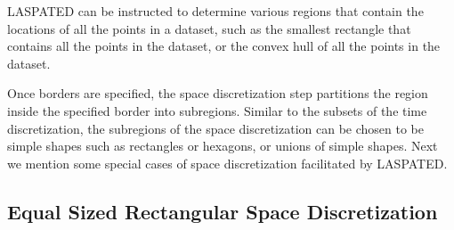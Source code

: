 \documentclass[article]{jss}
\newcommand{\ignore}[1]{}
\begin{document}
LASPATED can be instructed to determine various regions that contain the locations of all the points in a dataset, such as the smallest rectangle that contains all the points in the dataset, or the convex hull of all the points in the dataset.
\ignore{
If a customized border is not available, we can use a rectangular border containing all events or the convex hull of the space observations.
In the first case, the argument of parameter {\tt{method}} of LASPATED method add\_max\_borders is "rectangle" while in the second case this parameter {\tt{method}} is "convex".
The following Example \ref{list:5} shows how to define these borders.
Only one of these two options must be chosen.

\begin{lstlisting}[label={list:5},caption=Automatically defined borders.]
# adding rectangular borders
app.add_max_borders(method="rectangle")

# adding as border the convex hull of observations 
app.add_max_borders(method="convex")

# plotting borders and a sample of the events
import matplotlib as plt
fig, ax = plt.subplots()
app.max_borders.plot(ax=ax)
app.events_data.sample(10).plot(markersize=10, color='red', ax=ax)
plt.show()
\end{lstlisting}
}

Once borders are specified, the space discretization step partitions the region inside the specified border into subregions.
Similar to the subsets of the time discretization, the subregions of the space discretization can be chosen to be simple shapes such as rectangles or hexagons, or unions of simple shapes.
Next we mention some special cases of space discretization facilitated by LASPATED.


\subsection{Equal Sized Rectangular Space Discretization}
\end{document}
